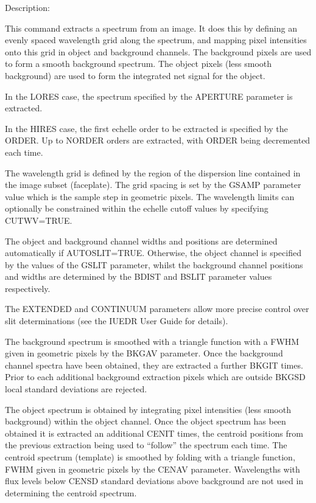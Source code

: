 \begin {description}
\begin {description}
\item Description:

This command extracts a spectrum from an image.
It does this by defining an evenly spaced wavelength grid along the
spectrum, and mapping pixel intensities onto this grid in object
and background channels.
The background pixels are used to form a smooth background spectrum.
The object pixels (less smooth background) are used to form the
integrated net signal for the object.

In the LORES case, the spectrum specified by the APERTURE parameter
is extracted.

In the HIRES case, the first echelle order to be extracted is
specified by the ORDER.
Up to NORDER orders are extracted, with ORDER being
decremented each time.

The wavelength grid is defined by the region of the dispersion line
contained in the image subset (faceplate).
The grid spacing is set by the GSAMP parameter value which is
the sample step in geometric pixels.
The wavelength limits can optionally be constrained within the
echelle cutoff values by specifying CUTWV=TRUE.

The object and background channel widths and positions are determined
automatically if AUTOSLIT=TRUE.
Otherwise, the object channel is specified by the values of the
GSLIT parameter, whilst the background channel positions and
widths are determined by the BDIST and BSLIT parameter values
respectively.

The EXTENDED and CONTINUUM parameters allow more precise control
over slit determinations (see the IUEDR User Guide for details).

The background spectrum is smoothed with a triangle function with a 
FWHM given in geometric pixels by the BKGAV parameter.
Once the background channel spectra have been obtained, they are
extracted a further BKGIT times.
Prior to each additional background extraction pixels which are
outside BKGSD local standard deviations are rejected.

The object spectrum is obtained by integrating pixel intensities
(less smooth background) within the object channel.
Once the object spectrum has been obtained it is extracted an
additional CENIT times, the centroid positions
from the previous extraction being used to ``follow'' the
spectrum each time.
The centroid spectrum (template) is smoothed by folding with a
triangle function, FWHM given in geometric
pixels by the CENAV parameter.
Wavelengths with flux levels below CENSD standard deviations
above background are not used in determining the centroid spectrum.


\end{description}
\end{description}
